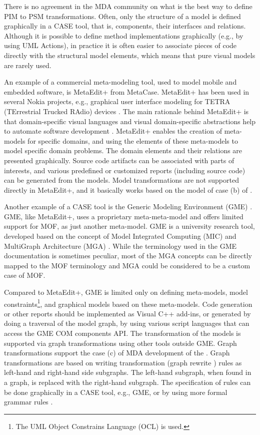 There is no agreement in the MDA community on what is the best way to define PIM to PSM transformations. Often, only the structure of a model is defined graphically in a CASE tool, that is, components, their interfaces and relations. Although it is possible to define method implementations graphically (e.g., by using UML Actions), in practice it is often easier to associate pieces of code directly with the structural model elements, which means that pure visual models are rarely used.

An example of a commercial meta-modeling tool, used to model mobile and embedded software, is MetaEdit+ \cite{MetaEdit.Home} from MetaCase. MetaEdit+ has been used in several Nokia \cite{www.nokia} projects, e.g., graphical user interface modeling for TETRA (TErrestrial Trucked RAdio) devices \cite{MetacaseCase.03}. The main rationale behind MetaEdit+ is that domain-specific visual languages and visual domain-specific abstractions help to automate software development \cite{metaedit.embedded}. MetaEdit+ enables the creation of meta-models for specific domains, and using the elements of these meta-models to model specific domain problems. The domain elements and their relations are presented graphically. Source code artifacts can be associated with parts of interests, and various predefined or customized reports (including source code) can be generated from the models. Model transformations are not supported directly in MetaEdit+, and it basically works based on the model of case (b) of . 

Another example of a CASE tool is the Generic Modeling Environment (GME) \cite{gme.01}. GME, like MetaEdit+, uses a proprietary meta-meta-model and offers limited support for MOF, as just another meta-model. GME is a university research tool, developed based on the concept of Model Integrated Computing (MIC) and MultiGraph Architecture (MGA) \cite{gme.mic}. While the terminology used in the GME documentation is sometimes peculiar, most of the MGA concepts can be directly mapped to the MOF terminology and MGA could be considered to be a custom case of MOF. %

Compared to MetaEdit+, GME is limited only on defining meta-models, model constraints\footnote{The UML Object Constrains Language (OCL) is used.}, and graphical models based on these meta-models. Code generation or other reports should be implemented as Visual C++ add-ins, or generated by doing a traversal of the model graph, by using various script languages that can access the GME COM components API. The transformation of the models is supported via graph transformations \cite{gme.graphs} using other tools outside GME. Graph transformations support the case (c) of MDA development of the . Graph transformations are based on writing transformation (graph rewrite \cite{schurr.graph.94,Blostein-Schuerr02:99}) rules as left-hand and right-hand side subgraphs. The left-hand subgraph, when found in a graph, is replaced with the right-hand subgraph. The specification of rules can be done graphically in a CASE tool, e.g., GME, or by using more formal grammar rules \cite{Rekers-Schuerr02:97}.

